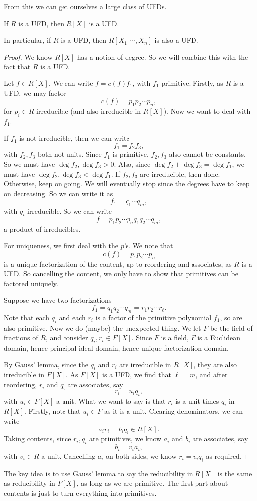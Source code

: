 \documentclass[a4paper]{article}
\begin{document}
From this we can get ourselves a large class of UFDs.
\begin{thm}
  If $R$ is a UFD, then $R[X]$ is a UFD.
\end{thm}
In particular, if $R$ is a UFD, then $R[X_1, \cdots, X_n]$ is also a UFD.

\begin{proof}
  We know $R[X]$ has a notion of degree. So we will combine this with the fact that $R$ is a UFD.

  Let $f \in R[X]$. We can write $f = c(f) f_1$, with $f_1$ primitive. Firstly, as $R$ is a UFD, we may factor
  \[
    c(f) = p_1 p_2 \cdots p_n,
  \]
  for $p_i \in R$ irreducible (and also irreducible in $R[X]$). Now we want to deal with $f_1$.

  If $f_1$ is not irreducible, then we can write
  \[
    f_1 = f_2 f_3,
  \]
  with $f_2, f_3$ both not units. Since $f_1$ is primitive, $f_2, f_3$ also cannot be constants. So we must have $\deg f_2, \deg f_3 > 0$. Also, since $\deg f_2 + \deg f_3 = \deg f_1$, we must have $\deg f_2, \deg f_3 < \deg f_1$. If $f_2, f_3$ are irreducible, then done. Otherwise, keep on going. We will eventually stop since the degrees have to keep on decreasing. So we can write it as
  \[
    f_1 = q_1 \cdots q_m,
  \]
  with $q_i$ irreducible. So we can write
  \[
    f = p_1 p_2 \cdots p_n q_1 q_2 \cdots q_m,
  \]
  a product of irreducibles.

  For uniqueness, we first deal with the $p$'s. We note that
  \[
    c(f) = p_1 p_2 \cdots p_n
  \]
  is a unique factorization of the content, up to reordering and associates, as $R$ is a UFD. So cancelling the content, we only have to show that primitives can be factored uniquely.

  Suppose we have two factorizations
  \[
    f_1 = q_1 q_2 \cdots q_m = r_1 r_2 \cdots r_\ell.
  \]
  Note that each $q_i$ and each $r_i$ is a factor of the primitive polynomial $f_1$, so are also primitive. Now we do (maybe) the unexpected thing. We let $F$ be the field of fractions of $R$, and consider $q_i, r_i \in F[X]$. Since $F$ is a field, $F$ is a Euclidean domain, hence principal ideal domain, hence unique factorization domain.

  By Gauss' lemma, since the $q_i$ and $r_i$ are irreducible in $R[X]$, they are also irreducible in $F[X]$. As $F[X]$ is a UFD, we find that $\ell = m$, and after reordering, $r_i$ and $q_i$ are associates, say
  \[
    r_i = u_i q_i,
  \]
  with $u_i \in F[X]$ a unit. What we want to say is that $r_i$ is a unit times $q_i$ in $R[X]$. Firstly, note that $u_i \in F$ as it is a unit. Clearing denominators, we can write
  \[
    a_i r_i = b_i q_i \in R[X].
  \]
  Taking contents, since $r_i, q_i$ are primitives, we know $a_i$ and $b_i$ are associates, say
  \[
    b_i = v_i a_i,
  \]
  with $v_i \in R$ a unit. Cancelling $a_i$ on both sides, we know $r_i = v_i q_i $ as required.
\end{proof}
The key idea is to use Gauss' lemma to say the reducibility in $R[X]$ is the same as reducibility in $F[X]$, as long as we are primitive. The first part about contents is just to turn everything into primitives.
\end{document}
